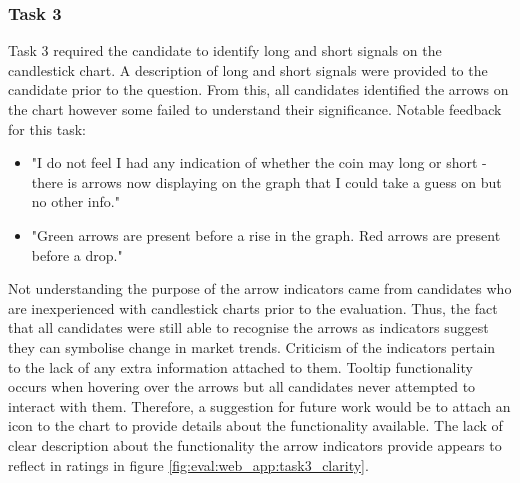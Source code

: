 

\subsubsection{Task 3}
\label{sec:evaluation:ui:tasks:q3}
\noindent Task 3 required the candidate to identify long and short signals on the candlestick chart. A description of long and short signals were provided to the candidate prior to the question. From this, all candidates identified the arrows on the chart however some failed to understand their significance. Notable feedback for this task:
\begin{itemize}
    \item "I do not feel I had any indication of whether the coin may long or short - there is arrows now displaying on the graph that I could take a guess on but no other info."
    \item "Green arrows are present before a rise in the graph. Red arrows are present before a drop."
\end{itemize}
Not understanding the purpose of the arrow indicators came from candidates who are inexperienced with candlestick charts prior to the evaluation. Thus, the fact that all candidates were still able to recognise the arrows as indicators suggest they can symbolise change in market trends. Criticism of the indicators pertain to the lack of any extra information attached to them. Tooltip functionality occurs when hovering over the arrows but all candidates never attempted to interact with them. Therefore, a suggestion for future work would be to attach an icon to the chart to provide details about the functionality available. The lack of clear description about the functionality the arrow indicators provide appears to reflect in ratings in figure \ref{fig:eval:web_app:task3_clarity}. 


